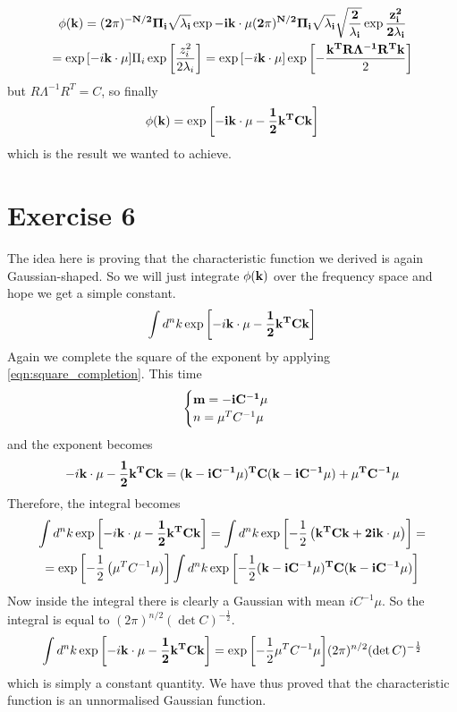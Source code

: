 \documentclass[a4paper,11pt,fleqn]{article}
\begin{document}
\begin{gather*}
    \phi(\bf{k}) = (2\pi)^{-N/2} \Pi_i\sqrt{\lambda_i} \exp{-i\bf{k}\cdot \bf{\mu}} (2\pi)^{N/2} \Pi_i \sqrt{\lambda_i} \sqrt{\frac{2}{\lambda_i}}\exp{\frac{z_i^2}{2\lambda_i}} \\
    = \exp{\left[-i\bf{k}\cdot \bf{\mu}\right]} \Pi_i \exp{\left[\frac{z_i^2}{2\lambda_i}\right]} = \exp{\left[-i\bf{k}\cdot \bf{\mu}\right]} \exp{\left[-\frac{\bf{k}^TR\Lambda^{-1} R^T\bf{k}}{2}\right]}
\end{gather*}
but $R \Lambda^{-1} R^T = C$, so finally 
\begin{gather*}
    \phi(\bf{k}) = \exp{\left[-i\bf{k}\cdot\bf{\mu}-\frac{1}{2}\bf{k}^TC\bf{k}\right]}
\end{gather*}
which is the result we wanted to achieve.




\section{Exercise 6}
The idea here is proving that the characteristic function we derived is again Gaussian-shaped.
So we will just integrate $\phi(\bf{k})$ over the frequency space and hope
we get a simple constant.
\begin{equation*}
    \int d^nk \exp{\left[-i\bf{k}\cdot\bf{\mu}-\frac{1}{2}\bf{k}^TC\bf{k}\right]}
\end{equation*}
Again we complete the square of the exponent by applying \ref{eqn:square_completion}.
This time 
\begin{gather*}
    \begin{cases}
        \bf{m} = -iC^{-1}\bf{\mu} \\
        n = \mu^TC^{-1}\mu
    \end{cases}
\end{gather*}
and the exponent becomes
\begin{gather*}
    -i\bf{k}\cdot\bf{\mu}-\frac{1}{2}\bf{k}^TC\bf{k} = (\bf{k}-iC^{-1}\bf{\mu})^TC (\bf{k}-iC^{-1}\bf{\mu}) + \mu^T C^{-1}\bf{\mu}
\end{gather*}
Therefore, the integral becomes 
\begin{gather*}
    \int d^nk \exp{\left[-i\bf{k}\cdot\bf{\mu}-\frac{1}{2}\bf{k}^TC\bf{k}\right]} = \int d^nk \exp{\left[-\frac{1}{2}\left(\bf{k}^TC\bf{k} + 2 i\bf{k}\cdot\bf{\mu} \right)\right]} =\\ 
    = \exp{\left[-\frac{1}{2}\left(\mu^T C^{-1}\mu\right) \right]}\int d^n k \exp{\left[-\frac{1}{2}(\bf{k}-iC^{-1}\bf{\mu})^TC (\bf{k}-iC^{-1}\bf{\mu})\right]}
\end{gather*}
Now inside the integral there is clearly a Gaussian with mean $iC^{-1}\mu$. So the integral
is equal to $(2\pi)^{n/2}(\det{C})^{-\frac{1}{2}}$.
\begin{gather*}
    \int d^nk \exp{\left[-i\bf{k}\cdot\bf{\mu}-\frac{1}{2}\bf{k}^TC\bf{k}\right]} = \exp{\left[-\frac{1}{2}\mu^T C^{-1}\mu \right]} (2\pi)^{n/2}(\det{C})^{-\frac{1}{2}}
\end{gather*}
which is simply a constant quantity. We have thus proved that the characteristic
function is an unnormalised Gaussian function.
\end{document}
